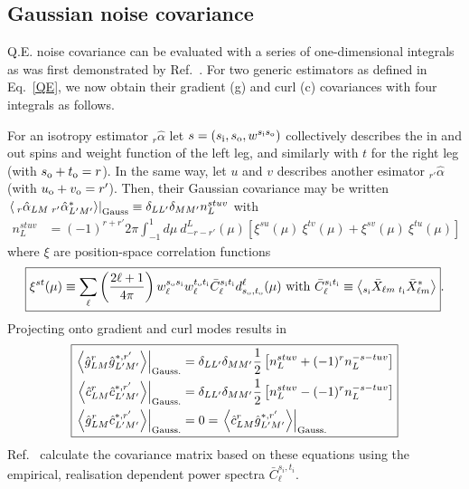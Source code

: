 \documentclass{article}
\newcommand{\si}[0]{{s_{\rm i}}}
\newcommand{\ti}[0]{{t_{\rm i}}}
\newcommand{\so}[0]{{s_{\rm o}}}
\renewcommand{\to}[0]{{t_{\rm o}}}
\newcommand{\uo}[0]{{u_{\rm o}}}
\newcommand{\vo}[0]{{v_{\rm o}}}
\newcommand{\av}[1]{\left\langle #1 \right\rangle}
\begin{document}
\subsection{Gaussian noise covariance}
Q.E. noise covariance can be evaluated with a series of one-dimensional integrals as was first demonstrated by Ref.~\cite{}. For two generic estimators as defined in Eq.~\eqref{QE}, we now obtain their gradient (g) and curl (c) covariances with four integrals as follows.

For an isotropy estimator $_{r}\hat \alpha$ let $s = (\si, \so, w^{\si\so})$ collectively describes the in and out spins and weight function of the left leg, and similarly with $t$ for the right leg (with $\so + \to = r$). In the same way, let $u$ and $v$ describes another esimator $_{r'}\hat \alpha$ (with $\uo + \vo = r'$). Then, their Gaussian covariance may be written $ \left.\av{\:_{r}\hat \alpha_{LM}\: _{r'}\hat \alpha^*_{L'M'}} \right|_{\rm Gauss} \equiv \delta_{LL'}\delta_{MM'}n_L^{stuv}$ with
\begin{equation}
\boxed{
\begin{split} 
n_L^{stuv} & = (-1)^{r + r'}2\pi  \int_{-1}^1 d \mu\:  d^L_{-r -r'}(\mu) \left[\xi^{su}(\mu)\:\xi^{tv}(\mu)  + \xi^{sv}(\mu)\:\xi^{tu}(\mu) \right]
\end{split}}
\end{equation}
where $\xi$ are position-space correlation functions
\begin{equation}\boxed{
\xi^{st}(\mu) \equiv  \sum_\ell \left(\frac{2\ell + 1}{4\pi}\right)w^{\so\si}_\ell w^{\to\ti}_\ell \bar C_\ell^{\si \ti} d^\ell_{\so,\to}(\mu)\textrm{ with } \bar C_\ell^{\si \ti} \equiv \av{ _{\si}\bar X_{\ell m}\: _{\ti} \bar X^*_{\ell m} }}.
\end{equation}
Projecting onto gradient and curl modes results in
\begin{equation} \boxed{
\begin{split}
\left.\av{\hat g^{r}_{LM} \hat g^{*, r'}_{L' M'} }\right|_{\rm Gauss.} &=\delta_{LL'}\delta_{MM'} \frac 12\left[n_L^{stuv} +  (-1)^{r} n^{-s-tuv}_L\right] \\
		\left.\av{\hat c^{r}_{LM} \hat c^{*, r'}_{L' M'} }\right|_{\rm Gauss.} &= \delta_{LL'}\delta_{MM'}\frac 12\left[n_L^{stuv} -  (-1)^{r} n^{-s-tuv}_L\right]\\
	\left.\av{\hat g^{r}_{LM} \hat c^{*, r'}_{L' M'} }\right|_{\rm Gauss.} &=0 = \left.\av{\hat c^{r}_{LM} \hat g^{*, r'}_{L' M'} }\right|_{\rm Gauss.}
\end{split}}
\end{equation}
Ref.~\cite{Aghanim:2018oex} calculate the covariance matrix based on these equations using the empirical, realisation dependent power spectra $\bar C_\ell^{s_i,t_i}$.
\end{document}
